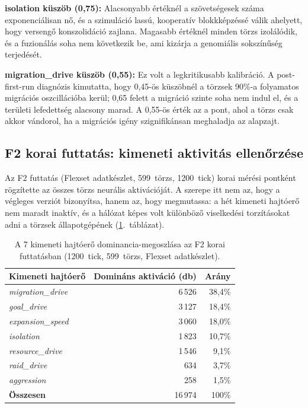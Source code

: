 \textbf{isolation küszöb (0{,}75):} Alacsonyabb értéknél a szövetségesek száma
exponenciálisan nő, és a szimuláció lassú, kooperatív blokkképzéssé válik
ahelyett, hogy versengő konszolidáció zajlana. Magasabb értéknél minden törzs
izolálódik, és a fuzionálás soha nem következik be, ami kizárja a genomiális
sokszínűség terjedését.

\textbf{migration\_drive küszöb (0{,}55):} Ez volt a legkritikusabb kalibráció.
A post-first-run diagnózis kimutatta, hogy 0{,}45-ös küszöbnél a törzsek 90\%-a
folyamatos migrációs oszcillációba kerül; 0{,}65 felett a migráció szinte soha
nem indul el, és a területi lefedettség alacsony marad. A 0{,}55-ös érték
az a pont, ahol a törzs csak akkor vándorol, ha a migrációs igény
szignifikánsan meghaladja az alapzajt.

\subsection*{F2 korai futtatás: kimeneti aktivitás ellenőrzése}

Az F2 futtatás (Flexset adatkészlet, 599~törzs, 1200~tick) korai mérési pontként
rögzítette az összes törzs neurális aktivációját. A szerepe itt nem az, hogy a
végleges verziót bizonyítsa, hanem az, hogy megmutassa: a hét kimeneti hajtóerő
nem maradt inaktív, és a hálózat képes volt különböző viselkedési torzításokat adni
a törzsek állapotgépének (\ref{tab:neurosim-f2-outputs}.~táblázat).

\begin{table}[h]
  \centering
  \caption{A 7 kimeneti hajtóerő dominancia-megoszlása az F2 korai futtatásban
    (1200~tick, 599~törzs, Flexset adatkészlet).}
  \label{tab:neurosim-f2-outputs}
  \begin{tabular}{lrr}
    \hline
    \textbf{Kimeneti hajtóerő} & \textbf{Domináns aktiváció (db)} & \textbf{Arány} \\
    \hline
    \textit{migration\_drive} & 6\,526 & 38{,}4\% \\
    \textit{goal\_drive}      & 3\,127 & 18{,}4\% \\
    \textit{expansion\_speed} & 3\,060 & 18{,}0\% \\
    \textit{isolation}        & 1\,823 & 10{,}7\% \\
    \textit{resource\_drive}  & 1\,546 &  9{,}1\% \\
    \textit{raid\_drive}      &   634 &  3{,}7\% \\
    \textit{aggression}       &   258 &  1{,}5\% \\
    \hline
    \textbf{Összesen}         & 16\,974 & 100\% \\
    \hline
  \end{tabular}
\end{table}

